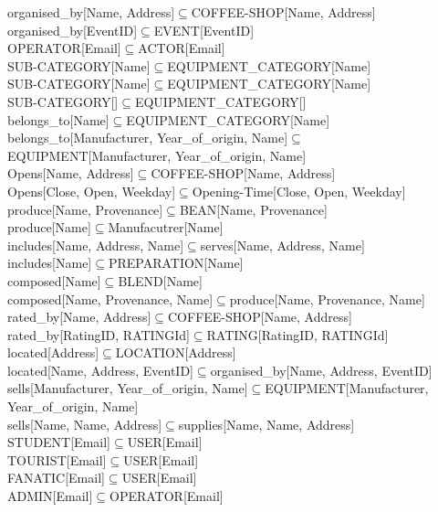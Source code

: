 organised\_by[Name,  Address]$\subseteq$COFFEE-SHOP[Name,  Address]\\
organised\_by[EventID]$\subseteq$EVENT[EventID]\\
OPERATOR[Email]$\subseteq$ACTOR[Email]\\
SUB-CATEGORY[Name]$\subseteq$EQUIPMENT\_CATEGORY[Name]\\
SUB-CATEGORY[Name]$\subseteq$EQUIPMENT\_CATEGORY[Name]\\
SUB-CATEGORY[]$\subseteq$EQUIPMENT\_CATEGORY[]\\
belongs\_to[Name]$\subseteq$EQUIPMENT\_CATEGORY[Name]\\
belongs\_to[Manufacturer,  Year\_of\_origin,  Name]$\subseteq$EQUIPMENT[Manufacturer,  Year\_of\_origin,  Name]\\
Opens[Name,  Address]$\subseteq$COFFEE-SHOP[Name,  Address]\\
Opens[Close,  Open,  Weekday]$\subseteq$Opening-Time[Close,  Open,  Weekday]\\
produce[Name,  Provenance]$\subseteq$BEAN[Name,  Provenance]\\
produce[Name]$\subseteq$Manufacutrer[Name]\\
includes[Name,  Address,  Name]$\subseteq$serves[Name,  Address,  Name]\\
includes[Name]$\subseteq$PREPARATION[Name]\\
composed[Name]$\subseteq$BLEND[Name]\\
composed[Name,  Provenance,  Name]$\subseteq$produce[Name,  Provenance,  Name]\\
rated\_by[Name,  Address]$\subseteq$COFFEE-SHOP[Name,  Address]\\
rated\_by[RatingID,  RATINGId]$\subseteq$RATING[RatingID,  RATINGId]\\
located[Address]$\subseteq$LOCATION[Address]\\
located[Name,  Address,  EventID]$\subseteq$organised\_by[Name,  Address,  EventID]\\
sells[Manufacturer,  Year\_of\_origin,  Name]$\subseteq$EQUIPMENT[Manufacturer,  Year\_of\_origin,  Name]\\
sells[Name,  Name,  Address]$\subseteq$supplies[Name,  Name,  Address]\\
STUDENT[Email]$\subseteq$USER[Email]\\
TOURIST[Email]$\subseteq$USER[Email]\\
FANATIC[Email]$\subseteq$USER[Email]\\
ADMIN[Email]$\subseteq$OPERATOR[Email]\\
